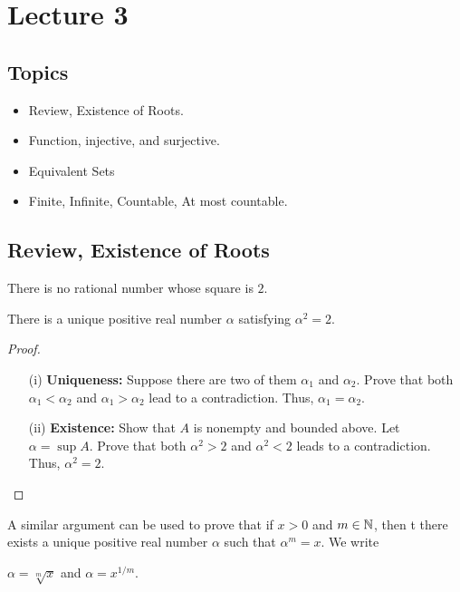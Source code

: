 \documentclass[a4paper]{report}
\begin{document}
\section{Lecture 3}


\subsection{Topics}

\begin{itemize}
    \item Review, Existence of Roots.
    \item Function, injective, and surjective.
    \item Equivalent Sets
    \item Finite, Infinite, Countable, At most countable.
\end{itemize}

\subsection{Review, Existence of Roots}

\begin{prop}
   There is no rational number whose square is \( 2 \). 
\end{prop}

\begin{theorem}[ ]
    There is a unique positive real number \( \alpha  \) satisfying \( \alpha^{2} = 2  \). 
\end{theorem}

\begin{proof}
\begin{enumerate}
    \item[(i)] \textbf{Uniqueness:} Suppose there are two of them \( {\alpha}_{1} \) and \( {\alpha}_{2} \). Prove that both \( {\alpha}_{1} < {\alpha}_{2} \) and \( {\alpha}_{1} > {\alpha}_{2} \) lead to a contradiction. Thus, \( {\alpha}_{1} = {\alpha}_{2} \). 
    \item[(ii)] \textbf{Existence:} Show that \( A  \) is nonempty and bounded above. Let \( \alpha = \sup A  \). Prove that both \( \alpha^{2} > 2  \) and \( \alpha^{2} < 2  \) leads to a contradiction. Thus, \( \alpha^{2} = 2  \).
\end{enumerate}
\end{proof}

\begin{remark}
    A similar argument can be used to prove that if \( x > 0  \) and \( m \in \mathbb{N}  \), then t there exists a unique positive real number \( \alpha  \) such that \( \alpha^{m} = x  \). We write
    \begin{center}
        \( \alpha = \sqrt[m]{ x } \) and \( \alpha = x^{1/m} \).
    \end{center}
\end{remark}
\end{document}
